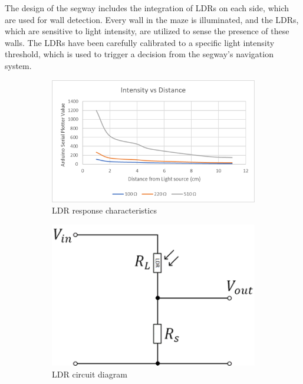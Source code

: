 The design of the segway includes the integration of LDRs on each side, which are used for wall detection. Every wall in the maze is illuminated, and the LDRs, which are sensitive to light intensity, are utilized to sense the presence of these walls. The LDRs have been carefully calibrated to a specific light intensity threshold, which is used to trigger a decision from the segway's navigation system.

\begin{figure}
    \centering
    \begin{subfigure}[b]{.45\linewidth}
        \includegraphics[width=\linewidth]{images/ldr-graph.png}
        \caption{LDR response characteristics}
    \end{subfigure}
    \begin{subfigure}[b]{0.45\linewidth}
        \includegraphics[width=\linewidth]{images/ldr-circuit.png}
        \caption{LDR circuit diagram}
    \end{subfigure}
    \caption{}
\end{figure}

